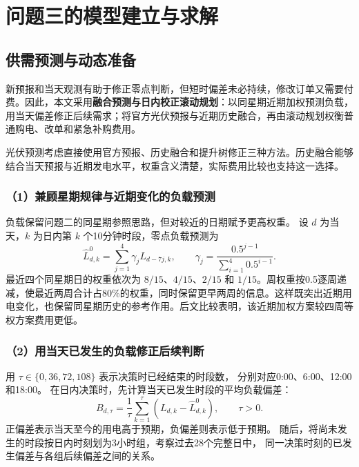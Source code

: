 \section{问题三的模型建立与求解}

\subsection{供需预测与动态准备}
新预报和当天观测有助于修正零点判断，但短时偏差未必持续，修改订单又需要付费。因此，本文采用\textbf{融合预测与日内校正滚动规划}：以同星期近期加权预测负载，用当天偏差修正后续需求；将官方光伏预报与近期历史融合，再由滚动规划权衡普通购电、改单和紧急补购费用。

光伏预测考虑直接使用官方预报、历史融合和提升树修正三种方法。历史融合能够结合当天预报与近期发电水平，权重含义清楚，实际费用比较也支持这一选择。

\subsubsection*{（1）兼顾星期规律与近期变化的负载预测}

负载保留问题二的同星期参照思路，但对较近的日期赋予更高权重。
设 $d$ 为当天，$k$ 为日内第 $k$ 个10分钟时段，零点负载预测为
\begin{equation}
\widehat L^{0}_{d,k}
=\sum_{j=1}^{4}\gamma_jL_{d-7j,k},\qquad
\gamma_j=\frac{0.5^{j-1}}{\sum_{i=1}^{4}0.5^{i-1}}.
\end{equation}
最近四个同星期日的权重依次为 $8/15$、$4/15$、$2/15$ 和 $1/15$。周权重按0.5逐周递减，使最近两周合计占80\%的权重，同时保留更早两周的信息。这样既突出近期用电变化，也保留同星期历史的参考作用。后文比较表明，该近期加权方案较四周等权方案费用更低。

\subsubsection*{（2）用当天已发生的负载修正后续判断}

用 $\tau\in\{0,36,72,108\}$ 表示决策时已经结束的时段数，
分别对应0:00、6:00、12:00和18:00。
在日内决策时，先计算当天已发生时段的平均负载偏差：
\begin{equation}
B_{d,\tau}=\frac{1}{\tau}\sum_{k=1}^{\tau}
\left(L_{d,k}-\widehat L^{0}_{d,k}\right),\qquad \tau>0.
\end{equation}
正偏差表示当天至今的用电高于预期，负偏差则表示低于预期。
随后，将尚未发生的时段按日内时刻划为3小时组，考察过去28个完整日中，
同一决策时刻的已发生偏差与各组后续偏差之间的关系。

